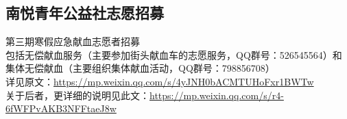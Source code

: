 \documentclass[letterpaper, 12pt]{article}
\begin{document}
\begin{multicols}{2}
\section{南悦青年公益社志愿招募}
第三期寒假应急献血志愿者招募\\
包括无偿献血服务（主要参加街头献血车的志愿服务，QQ群号：526545564）和集体无偿献血（主要组织集体献血活动，QQ群号：798856708）\\
详见原文：\url{https://mp.weixin.qq.com/s/4yJNH0bACMTUHoFxr1BWTw}\\
关于后者，更详细的说明见此文：\url{https://mp.weixin.qq.com/s/r4-6fWFPvAKB3NFFtaeJ8w}

\end{multicols} 
\end{document}
